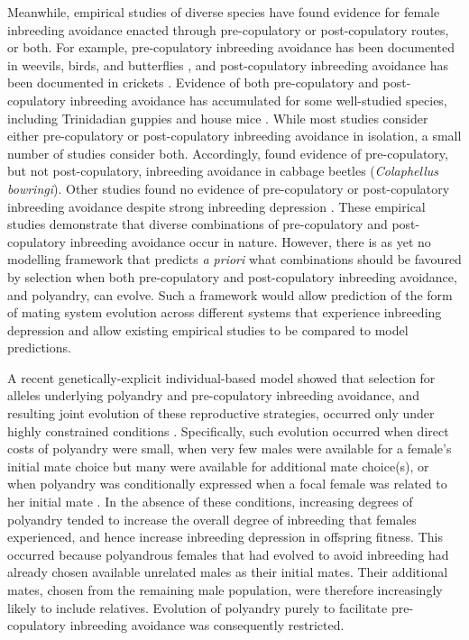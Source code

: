 \documentclass[10pt,letterpaper]{article}
\begin{document}
Meanwhile, empirical studies of diverse species have found evidence for female inbreeding avoidance enacted through pre-copulatory or post-copulatory routes, or both. For example, pre-copulatory inbreeding avoidance has been documented in weevils, birds, and butterflies \cite[e.g.,][]{Kuriwada2011, Kingma2013, Fischer2015}, and post-copulatory inbreeding avoidance has been documented in crickets \cite[e.g.,][]{Simmons2006, Bretman2009}. Evidence of both pre-copulatory and post-copulatory inbreeding avoidance has accumulated for some well-studied species, including Trinidadian guppies \cite[\textit{Poecilia reticulata};][]{Gasparini2011, Daniel2015} and house mice \cite[\textit{Mus domesticus};][]{Potts1991, Firman2015}. While most studies consider either pre-copulatory or post-copulatory inbreeding avoidance in isolation, a small number of studies consider both. Accordingly, \cite{Liu2014} found evidence of pre-copulatory, but not post-copulatory, inbreeding avoidance in cabbage beetles (\textit{Colaphellus bowringi}). Other studies found no evidence of pre-copulatory or post-copulatory inbreeding avoidance despite strong inbreeding depression \cite[e.g.,][]{Reid2014, Reid2015}. These empirical studies demonstrate that diverse combinations of pre-copulatory and post-copulatory inbreeding avoidance occur in nature. However, there is as yet no modelling framework that predicts \textit{a priori} what combinations should be favoured by selection when both pre-copulatory and post-copulatory inbreeding avoidance, and polyandry, can evolve. Such a framework would allow prediction of the form of mating system evolution across different systems that experience inbreeding depression and allow existing empirical studies to be compared to model predictions.

A recent genetically-explicit individual-based model showed that selection for alleles underlying polyandry and pre-copulatory inbreeding avoidance, and resulting joint evolution of these reproductive strategies, occurred only under highly constrained conditions \cite[][]{Duthie}. Specifically, such evolution occurred when direct costs of polyandry were small, when very few males were available for a female's initial mate choice but many were available for additional mate choice(s), or when polyandry was conditionally expressed when a focal female was related to her initial mate \cite[][]{Duthie}. In the absence of these conditions, increasing degrees of polyandry tended to increase the overall degree of inbreeding that females experienced, and hence increase inbreeding depression in offspring fitness. This occurred because polyandrous females that had evolved to avoid inbreeding had already chosen available unrelated males as their initial mates. Their additional mates, chosen from the remaining male population, were therefore increasingly likely to include relatives. Evolution of polyandry purely to facilitate pre-copulatory inbreeding avoidance was consequently restricted.
\end{document}
